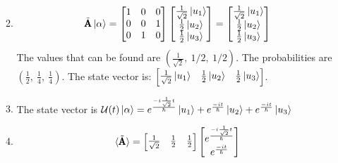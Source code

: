 \documentclass[12pt]{article}
\newcommand{\OP}[1]{\tilde{\pmb{\text{#1}}}}
\newcommand{\Fop}[1]{\mathcal{#1}}
\begin{document}
\begin{enumerate}
\begin{enumerate}
\begin{gather*}
            \end{gather*}
            \item
            \begin{gather*}
                \OP{A}\ket{\alpha}=
                \begin{bmatrix}
                    1 & 0 & 0 \\
                    0 & 0 & 1 \\
                    0 & 1 & 0
                \end{bmatrix}
                \begin{bmatrix}
                    \frac{1}{\sqrt{2}}\ket{u_1} \\
                    \frac{1}{2}\ket{u_2}        \\
                    \frac{1}{2}\ket{u_3}
                \end{bmatrix}
                =
                \begin{bmatrix}
                    \frac{1}{\sqrt{2}}\ket{u_1} \\
                    \frac{1}{2}\ket{u_2}        \\
                    \frac{1}{2}\ket{u_3}
                \end{bmatrix}
            \end{gather*}
            The values that can be found are $\left( \frac{1}{\sqrt{2}},\ 1/2,\ 1/2 \right)$.
            The probabilities are $\left( \frac{1}{2},\ \frac{1}{4},\ \frac{1}{4} \right)$.
            The state vector is:
            $\begin{bmatrix}
                 \frac{1}{\sqrt{2}}\ket{u_1} & \frac{1}{2}\ket{u_2}        & \frac{1}{2}\ket{u_3}
            \end{bmatrix}$.
            \item The state vector is $\Fop{U}(t)\ket{\alpha}=e^{\frac{-i\frac{1}{\sqrt{2}}t}{\hbar}}\ket{u_1}+e^{\frac{-it}{\hbar}}\ket{u_2}+e^{\frac{-it}{\hbar}}\ket{u_3}$
            \item
            \begin{gather*}
                \braket{\OP{A}}=
                \begin{bmatrix}
                    \frac{1}{\sqrt{2}} & \frac{1}{2} & \frac{1}{2}
                \end{bmatrix}
                \begin{bmatrix}
                    e^{\frac{-i\frac{1}{\sqrt{2}}t}{\hbar}} \\
                    e^{\frac{-it}{\hbar}}                   \\

\end{bmatrix}
\end{gather*}
\end{enumerate}
\end{enumerate}
\end{document}
